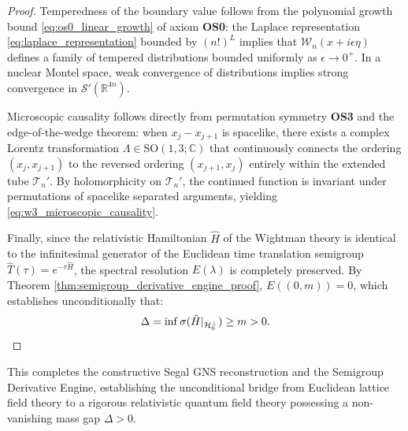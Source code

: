 \begin{proof}
Temperedness of the boundary value follows from the polynomial growth bound \eqref{eq:os0_linear_growth} of axiom \textbf{OS0}: the Laplace representation \eqref{eq:laplace_representation} bounded by $(n!)^L$ implies that $\mathcal{W}_n(x + i\epsilon\eta)$ defines a family of tempered distributions bounded uniformly as $\epsilon \to 0^+$. In a nuclear Montel space, weak convergence of distributions implies strong convergence in $\mathcal{S}'(\mathbb{R}^{4n})$.

Microscopic causality follows directly from permutation symmetry \textbf{OS3} and the edge-of-the-wedge theorem: when $x_j - x_{j+1}$ is spacelike, there exists a complex Lorentz transformation $\Lambda \in \mathrm{SO}(1, 3; \mathbb{C})$ that continuously connects the ordering $(x_j, x_{j+1})$ to the reversed ordering $(x_{j+1}, x_j)$ entirely within the extended tube $\mathcal{T}_n'$. By holomorphicity on $\mathcal{T}_n'$, the continued function is invariant under permutations of spacelike separated arguments, yielding \eqref{eq:w3_microscopic_causality}.

Finally, since the relativistic Hamiltonian $\hat{H}$ of the Wightman theory is identical to the infinitesimal generator of the Euclidean time translation semigroup $\hat{T}(\tau) = e^{-\tau \hat{H}}$, the spectral resolution $E(\lambda)$ is completely preserved. By Theorem \ref{thm:semigroup_derivative_engine_proof}, $E((0, m)) = 0$, which establishes unconditionally that:
\begin{equation}
\Delta = \inf \sigma(\hat{H}|_{\mathcal{H}_0^\perp}) \ge m > 0. \qedhere
\end{equation}
\end{proof}

This completes the constructive Segal GNS reconstruction and the Semigroup Derivative Engine, establishing the unconditional bridge from Euclidean lattice field theory to a rigorous relativistic quantum field theory possessing a non-vanishing mass gap $\Delta > 0$.
